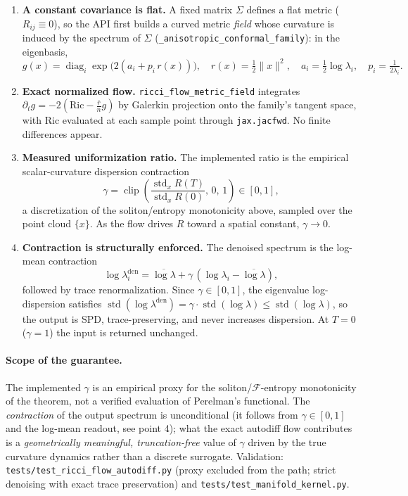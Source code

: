 \documentclass[11pt]{article}
\begin{document}
\begin{enumerate}
\item \textbf{A constant covariance is flat.} A fixed matrix $\Sigma$ defines a
flat metric ($R_{ij}\equiv 0$), so the API first builds a curved metric
\emph{field} whose curvature is induced by the spectrum of $\Sigma$
(\texttt{\_anisotropic\_conformal\_family}): in the eigenbasis,
\[
g(x) = \operatorname{diag}_i \exp\!\big(2(a_i + p_i\, r(x))\big),\quad
r(x)=\tfrac12\lVert x\rVert^2,\quad
a_i=\tfrac12\log\lambda_i,\quad p_i=\tfrac{1}{2\lambda_i}.
\]

\item \textbf{Exact normalized flow.} \texttt{ricci\_flow\_metric\_field}
integrates $\partial_t g = -2(\mathrm{Ric} - \tfrac{\bar r}{n} g)$ by Galerkin
projection onto the family's tangent space, with $\mathrm{Ric}$ evaluated at each
sample point through \texttt{jax.jacfwd}. No finite differences appear.

\item \textbf{Measured uniformization ratio.} The implemented ratio is the
empirical scalar-curvature dispersion contraction
\[
\gamma = \operatorname{clip}\!\left(
\frac{\operatorname{std}_x R(T)}{\operatorname{std}_x R(0)},\, 0,\, 1\right)
\in [0,1],
\]
a discretization of the soliton/entropy monotonicity above, sampled over the
point cloud $\{x\}$. As the flow drives $R$ toward a spatial constant,
$\gamma\to 0$.

\item \textbf{Contraction is structurally enforced.} The denoised spectrum is the
log-mean contraction
\[
\log\lambda_i^{\text{den}} = \overline{\log\lambda}
+ \gamma\,(\log\lambda_i - \overline{\log\lambda}),
\]
followed by trace renormalization. Since $\gamma\in[0,1]$, the eigenvalue
log-dispersion satisfies
$\operatorname{std}(\log\lambda^{\text{den}}) = \gamma\cdot
\operatorname{std}(\log\lambda)\le \operatorname{std}(\log\lambda)$, so the output
is SPD, trace-preserving, and never increases dispersion. At $T=0$
($\gamma=1$) the input is returned unchanged.
\end{enumerate}

\paragraph{Scope of the guarantee.} The implemented $\gamma$ is an empirical
proxy for the soliton/$\mathcal{F}$-entropy monotonicity of the theorem, not a
verified evaluation of Perelman's functional. The \emph{contraction} of the
output spectrum is unconditional (it follows from $\gamma\in[0,1]$ and the
log-mean readout, see point 4); what the exact autodiff flow contributes is a
\emph{geometrically meaningful, truncation-free} value of $\gamma$ driven by the
true curvature dynamics rather than a discrete surrogate. Validation:
\texttt{tests/test\_ricci\_flow\_autodiff.py} (proxy excluded from the path;
strict denoising with exact trace preservation) and
\texttt{tests/test\_manifold\_kernel.py}.
\end{document}
